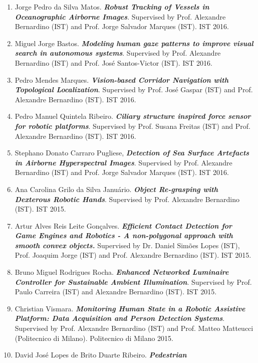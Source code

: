 \begin{enumerate}
{{  tracking for mobile robots}}. Supervised by Prof. Alexandre Bernardino
  (IST). IST 2016.
\item
  Jorge Pedro da Silva Matos. \emph{\textbf{Robust Tracking of Vessels
  in Oceanographic Airborne Images}}. Supervised by Prof. Alexandre
  Bernardino (IST) and Prof. Jorge Salvador Marques (IST). IST 2016.
\item
  Miguel Jorge Bastos. \emph{\textbf{Modeling human gaze patterns to
  improve visual search in autonomous systems}}. Supervised by Prof.
  Alexandre Bernardino (IST) and Prof. José Santos-Victor (IST). IST
  2016.
\item
  Pedro Mendes Marques. \emph{\textbf{Vision-based Corridor Navigation
  with Topological Localization}}. Supervised by Prof. José Gaspar (IST)
  and Prof. Alexandre Bernardino (IST). IST 2016.
\item
  Pedro Manuel Quintela Ribeiro. \emph{\textbf{Ciliary structure
  inspired force sensor for robotic platforms}}. Supervised by Prof.
  Susana Freitas (IST) and Prof. Alexandre Bernardino (IST). IST 2016.
\item
  Stephano Donato Carraro Pugliese, \emph{\textbf{Detection of Sea
  Surface Artefacts in Airborne Hyperspectral Images}}. Supervised by
  Prof. Alexandre Bernardino (IST) and Prof. Jorge Salvador Marques
  (IST). IST 2016.
\item
  Ana Carolina Grilo da Silva Januário. \emph{\textbf{Object Re-grasping
  with Dexterous Robotic Hands}}. Supervised by Prof. Alexandre
  Bernardino (IST). IST 2015.
\item
  Artur Alves Reis Leite Gonçalves. \emph{\textbf{Efficient Contact
  Detection for Game Engines and Robotics - A non-polygonal approach
  with smooth convex objects.}} Supervised by Dr. Daniel Simões Lopes
  (IST), Prof. Joaquim Jorge (IST) and Prof. Alexandre Bernardino (IST).
  IST 2015.
\item
  Bruno Miguel Rodrigues Rocha. \emph{\textbf{Enhanced Networked
  Luminaire Controller for Sustainable Ambient Illumination}}.
  Supervised by Prof. Paulo Carreira (IST) and Alexandre Bernardino
  (IST). IST 2015.
\item
  Christian Vismara. \emph{\textbf{Monitoring Human State in a Robotic
  Assistive Platform: Data Acquisition and Person Detection Systems}}.
  Supervised by Prof. Alexandre Bernardino (IST) and Prof. Matteo
  Matteucci (Politecnico di Milano). Politecnico di Milano 2015.
\item
  David José Lopes de Brito Duarte Ribeiro. \emph{\textbf{Pedestrian
}}
\end{enumerate}
